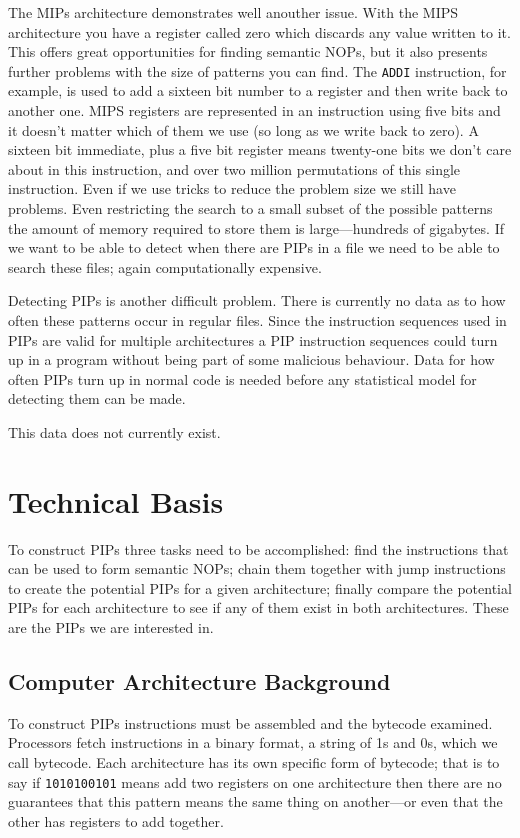 \documentclass[12pt,]{book}
\begin{document}
The MIPs architecture demonstrates well anouther issue. With the MIPS
architecture you have a register called zero which discards any value
written to it. This offers great opportunities for finding semantic
NOPs, but it also presents further problems with the size of patterns
you can find. The \lstinline!ADDI! instruction, for example, is used to
add a sixteen bit number to a register and then write back to another
one. MIPS registers are represented in an instruction using five bits
and it doesn't matter which of them we use (so long as we write back to
zero). A sixteen bit immediate, plus a five bit register means
twenty-one bits we don't care about in this instruction, and over two
million permutations of this single instruction. Even if we use tricks
to reduce the problem size we still have problems. Even restricting the
search to a small subset of the possible patterns the amount of memory
required to store them is large---hundreds of gigabytes. If we want to
be able to detect when there are PIPs in a file we need to be able to
search these files; again computationally expensive.

Detecting PIPs is another difficult problem. There is currently no data
as to how often these patterns occur in regular files. Since the
instruction sequences used in PIPs are valid for multiple architectures
a PIP instruction sequences could turn up in a program without being
part of some malicious behaviour. Data for how often PIPs turn up in
normal code is needed before any statistical model for detecting them
can be made.

This data does not currently exist.

\chapter{Technical Basis}

To construct PIPs three tasks need to be accomplished: find the
instructions that can be used to form semantic NOPs; chain them together
with jump instructions to create the potential PIPs for a given
architecture; finally compare the potential PIPs for each architecture
to see if any of them exist in both architectures. These are the PIPs we
are interested in.

\section{Computer Architecture Background}

To construct PIPs instructions must be assembled and the bytecode
examined. Processors fetch instructions in a binary format, a string of
1s and 0s, which we call bytecode. Each architecture has its own
specific form of bytecode; that is to say if \lstinline!1010100101!
means add two registers on one architecture then there are no guarantees
that this pattern means the same thing on another---or even that the
other has registers to add together.
\end{document}

